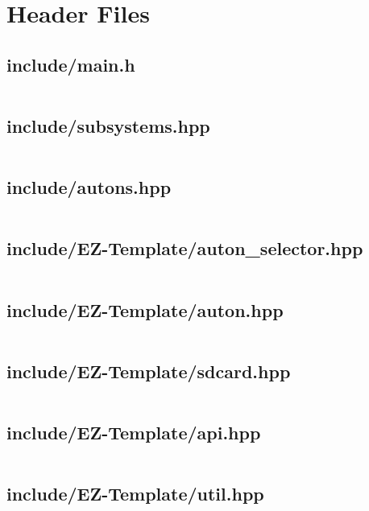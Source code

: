 \section{Header Files}

\subsection{include/main.h}
\inputminted[linenos,tabsize=2,breaklines, breakanywhere]{c}{main.h}
\pagebreak

\subsection{include/subsystems.hpp}
\inputminted[linenos,tabsize=2,breaklines, breakanywhere]{c}{subsystems.hpp}
\pagebreak

\subsection{include/autons.hpp}
\inputminted[linenos,tabsize=2,breaklines, breakanywhere]{c}{autons.hpp}
\pagebreak

\subsection{include/EZ-Template/auton_selector.hpp}
\inputminted[linenos,tabsize=2,breaklines, breakanywhere]{c}{auton_selector.hpp}
\pagebreak

\subsection{include/EZ-Template/auton.hpp}
\inputminted[linenos,tabsize=2,breaklines, breakanywhere]{c}{auton.hpp}
\pagebreak

\subsection{include/EZ-Template/sdcard.hpp}
\inputminted[linenos,tabsize=2,breaklines, breakanywhere]{c}{sdcard.hpp}
\pagebreak

\subsection{include/EZ-Template/api.hpp}
\inputminted[linenos,tabsize=2,breaklines, breakanywhere]{c}{api.hpp}
\pagebreak

\subsection{include/EZ-Template/util.hpp}
\inputminted[linenos,tabsize=2,breaklines, breakanywhere]{c}{util.hpp}
\pagebreak

